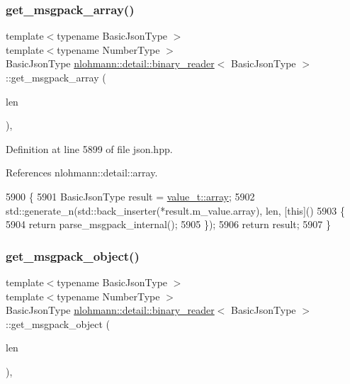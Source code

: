 \subsubsection{\texorpdfstring{get\+\_\+msgpack\+\_\+array()}{get\_msgpack\_array()}}
{\footnotesize\ttfamily template$<$typename Basic\+Json\+Type $>$ \\
template$<$typename Number\+Type $>$ \\
Basic\+Json\+Type \hyperlink{classnlohmann_1_1detail_1_1binary__reader}{nlohmann\+::detail\+::binary\+\_\+reader}$<$ Basic\+Json\+Type $>$\+::get\+\_\+msgpack\+\_\+array (\begin{DoxyParamCaption}\item[{const Number\+Type}]{len }\end{DoxyParamCaption})\hspace{0.3cm}{\ttfamily [inline]}, {\ttfamily [private]}}



Definition at line 5899 of file json.\+hpp.



References nlohmann\+::detail\+::array.


\begin{DoxyCode}
5900     \{
5901         BasicJsonType result = \hyperlink{namespacenlohmann_1_1detail_a1ed8fc6239da25abcaf681d30ace4985af1f713c9e000f5d3f280adbd124df4f5}{value\_t::array};
5902         std::generate\_n(std::back\_inserter(*result.m\_value.array), len, [\textcolor{keyword}{this}]()
5903         \{
5904             return parse\_msgpack\_internal();
5905         \});
5906         \textcolor{keywordflow}{return} result;
5907     \}
\end{DoxyCode}
\mbox{\label{classnlohmann_1_1detail_1_1binary__reader_a8fd9972d8bbb03b49acbaaf641151859}} 
\subsubsection{\texorpdfstring{get\+\_\+msgpack\+\_\+object()}{get\_msgpack\_object()}}
{\footnotesize\ttfamily template$<$typename Basic\+Json\+Type $>$ \\
template$<$typename Number\+Type $>$ \\
Basic\+Json\+Type \hyperlink{classnlohmann_1_1detail_1_1binary__reader}{nlohmann\+::detail\+::binary\+\_\+reader}$<$ Basic\+Json\+Type $>$\+::get\+\_\+msgpack\+\_\+object (\begin{DoxyParamCaption}\item[{const Number\+Type}]{len }\end{DoxyParamCaption})\hspace{0.3cm}{\ttfamily [inline]}, {\ttfamily [private]}}



